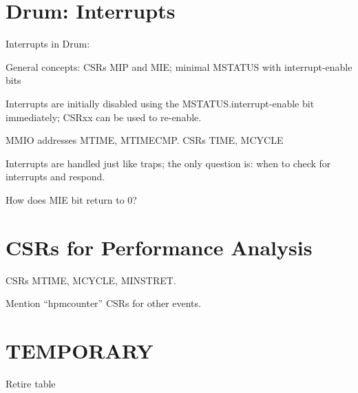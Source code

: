 
\section{Drum: Interrupts}

Interrupts in Drum:
\begin{tightlist}
  \item General concepts: CSRs MIP and MIE; minimal MSTATUS with interrupt-enable bits

  \item Interrupts are initially disabled using the
        MSTATUS.interrupt-enable bit immediately; CSRxx can be used to
        re-enable.

  \item MMIO addresses MTIME, MTIMECMP.  CSRs TIME, MCYCLE

  \item Interrupts are handled just like traps; the only question is:
        when to check for interrupts and respond.

  \item How does MIE bit return to 0?

\end{tightlist}


\section{CSRs for Performance Analysis}

CSRs MTIME, MCYCLE, MINSTRET.

Mention ``hpmcounter'' CSRs for other events.


\section{TEMPORARY}

Retire table

